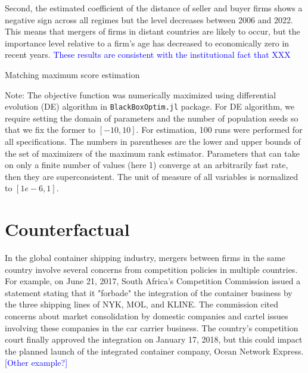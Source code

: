 \documentclass[10pt]{article}
\begin{document}
Second, the estimated coefficient of the distance of seller and buyer firms shows a negative sign across all regimes but the level decreases between 2006 and 2022. 
This means that mergers of firms in distant countries are likely to occur, but the importance level relative to a firm's age has decreased to economically zero in recent years.
\textcolor{blue}{These results are consistent with the institutional fact that XXX}

\begin{table}[!htbp]
  \begin{center}
      \caption{Matching maximum score estimation}
      \label{tb:maximum_score_estimate} 
      
  \end{center}\footnotesize
  Note: The objective function was numerically maximized using differential evolution (DE) algorithm in \texttt{BlackBoxOptim.jl} package. For DE algorithm, we require setting the domain of parameters and the number of population seeds so that we fix the former to $[-10, 10]$. For estimation, 100 runs were performed for all specifications. The numbers in parentheses are the lower and upper bounds of the set of maximizers of the maximum rank estimator.  Parameters that can take on only a finite number of values (here 1) converge at an arbitrarily fast rate, then they are superconsistent. The unit of measure of all variables is normalized to $[1e-6,1]$. 
\end{table} 

\section{Counterfactual}\label{sec:counterfactuals}

In the global container shipping industry, mergers between firms in the same country involve several concerns from competition policies in multiple countries.
For example, on June 21, 2017, South Africa's Competition Commission issued a statement stating that it "forbade" the integration of the container business by the three shipping lines of NYK, MOL, and KLINE. 
The commission cited concerns about market consolidation by domestic companies and cartel issues involving these companies in the car carrier business.
The country's competition court finally approved the integration on January 17, 2018, but this could impact the planned launch of the integrated container company, Ocean Network Express. 
\textcolor{blue}{[Other example?]}
\end{document}
